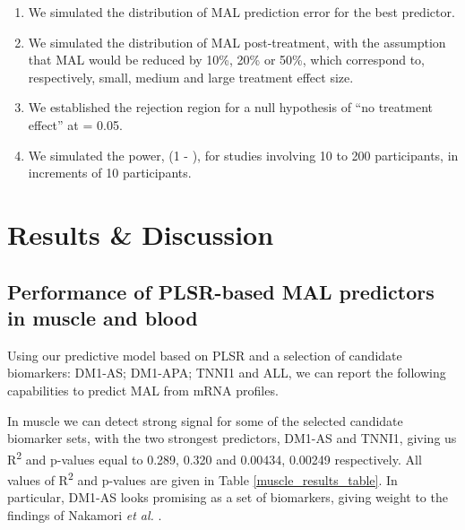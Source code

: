 \documentclass[10pt,letterpaper]{article}
\begin{document}
\begin{enumerate}
\item We simulated the distribution of MAL prediction error for the best predictor.
\item We simulated the distribution of MAL post-treatment, with the assumption that MAL would be reduced by 10\%, 20\% or 50\%, which correspond to, respectively, small, medium and large treatment effect size.
\item We established the rejection region for a null hypothesis of ``no treatment effect'' at {\textalpha} = 0.05.
\item We simulated the power, (1 - {\textbeta}), for studies involving 10 to 200 participants, in increments of 10 participants.
\end{enumerate}



\section*{Results \& Discussion} \label{ResultsDiscussion}

\subsection*{Performance of PLSR-based MAL predictors in muscle and blood} \label{PLSRPerformance}

Using our predictive model based on PLSR and a selection of candidate biomarkers: DM1-AS; DM1-APA; TNNI1 and ALL, we can report the following capabilities to predict MAL from mRNA profiles.

In muscle we can detect strong signal for some of the selected candidate biomarker sets, with the two strongest predictors, DM1-AS and TNNI1, giving us R\textsuperscript{2} and p-values equal to 0.289, 0.320 and 0.00434, 0.00249 respectively. All values of R\textsuperscript{2} and p-values are given in Table \ref{muscle_results_table}. In particular, DM1-AS looks promising as a set of biomarkers, giving weight to the findings of Nakamori {\it et al.} \cite{Nakamori2013}.
\end{document}
